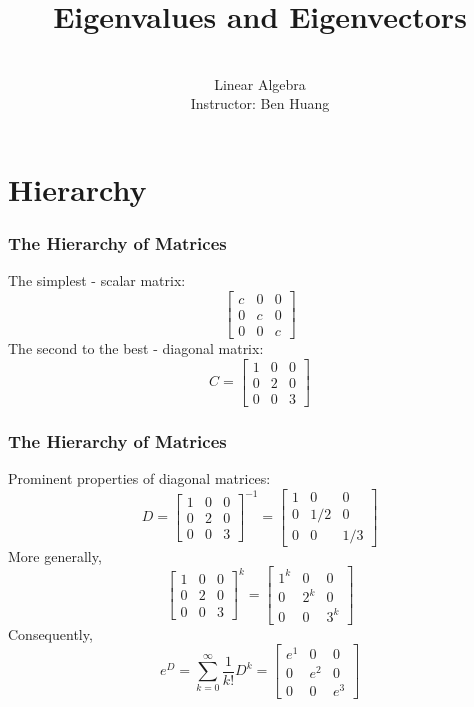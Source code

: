 \documentclass[10pt]{beamer}
\author[B.H.]{\vspace{1em}\\{\Large Linear Algebra}\\
\vspace{2em}
Instructor: Ben Huang}
\date{}
\title[]{Eigenvalues and Eigenvectors}
\begin{document}
\frame{\titlepage}

\section{Hierarchy}
\begin{frame}
\frametitle{The Hierarchy of Matrices}
The simplest - scalar matrix:
\[
\begin{bmatrix}
c&0&0\\
0&c&0\\
0&0&c
\end{bmatrix}
\]\pause
The second to the best - diagonal matrix:
\[
C = \begin{bmatrix}
1&0&0\\
0&2&0\\
0&0&3
\end{bmatrix}
\]
\end{frame}
\begin{frame}
\frametitle{The Hierarchy of Matrices}
Prominent properties of diagonal matrices:\pause
\[
D = \begin{bmatrix}
1&0&0\\
0&2&0\\
0&0&3
\end{bmatrix}^{-1} = \begin{bmatrix}
1&0&0\\
0&1/2&0\\
0&0&1/3
\end{bmatrix}
\]\pause
More generally, 
\[
\begin{bmatrix}
1&0&0\\
0&2&0\\
0&0&3
\end{bmatrix}^k = \begin{bmatrix}
1^k&0&0\\
0&2^k&0\\
0&0&3^k
\end{bmatrix}
\]\pause
Consequently, 
\[
e^D = \sum_{k = 0}^\infty \frac{1}{k!}D^k =  \begin{bmatrix}
e^1&0&0\\
0&e^2&0\\
0&0&e^3
\end{bmatrix}
\]
\end{frame}
\end{document}
